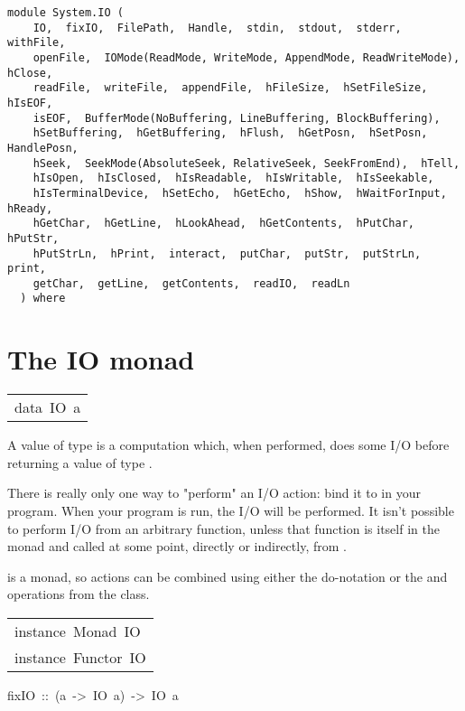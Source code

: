 \label{module:System.IO}
\haddockbeginheader
{\haddockverb\begin{verbatim}
module System.IO (
    IO,  fixIO,  FilePath,  Handle,  stdin,  stdout,  stderr,  withFile, 
    openFile,  IOMode(ReadMode, WriteMode, AppendMode, ReadWriteMode),  hClose, 
    readFile,  writeFile,  appendFile,  hFileSize,  hSetFileSize,  hIsEOF, 
    isEOF,  BufferMode(NoBuffering, LineBuffering, BlockBuffering), 
    hSetBuffering,  hGetBuffering,  hFlush,  hGetPosn,  hSetPosn,  HandlePosn, 
    hSeek,  SeekMode(AbsoluteSeek, RelativeSeek, SeekFromEnd),  hTell, 
    hIsOpen,  hIsClosed,  hIsReadable,  hIsWritable,  hIsSeekable, 
    hIsTerminalDevice,  hSetEcho,  hGetEcho,  hShow,  hWaitForInput,  hReady, 
    hGetChar,  hGetLine,  hLookAhead,  hGetContents,  hPutChar,  hPutStr, 
    hPutStrLn,  hPrint,  interact,  putChar,  putStr,  putStrLn,  print, 
    getChar,  getLine,  getContents,  readIO,  readLn
  ) where\end{verbatim}}
\haddockendheader

\section{The IO monad
}
\begin{haddockdesc}
\item[\begin{tabular}{@{}l}
data\ IO\ a
\end{tabular}]\haddockbegindoc
A value of type  is a computation which, when performed,
does some I/O before returning a value of type .
\par
There is really only one way to "perform" an I/O action: bind it to
 in your program.  When your program is run, the I/O will
be performed.  It isn't possible to perform I/O from an arbitrary
function, unless that function is itself in the  monad and called
at some point, directly or indirectly, from .
\par
{} is a monad, so  actions can be combined using either the do-notation
or the \haddocktt{>>} and \haddocktt{>>=} operations from the  class.
\par

\end{haddockdesc}
\begin{haddockdesc}
\item[\begin{tabular}{@{}l}
instance\ Monad\ IO\\instance\ Functor\ IO
\end{tabular}]
\end{haddockdesc}
\begin{haddockdesc}
\item[
fixIO\ ::\ (a\ ->\ IO\ a)\ ->\ IO\ a
]
\end{haddockdesc}
